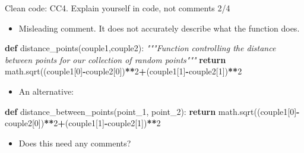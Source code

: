 \documentclass[
  8pt,
  ignorenonframetext,
]{beamer}
\newenvironment{Shaded}{\begin{snugshade}}{\end{snugshade}}
\newcommand{\CommentTok}[1]{\textcolor[rgb]{0.56,0.35,0.01}{\textit{#1}}}
\newcommand{\ControlFlowTok}[1]{\textcolor[rgb]{0.13,0.29,0.53}{\textbf{#1}}}
\newcommand{\DecValTok}[1]{\textcolor[rgb]{0.00,0.00,0.81}{#1}}
\newcommand{\KeywordTok}[1]{\textcolor[rgb]{0.13,0.29,0.53}{\textbf{#1}}}
\newcommand{\NormalTok}[1]{#1}
\newcommand{\OperatorTok}[1]{\textcolor[rgb]{0.81,0.36,0.00}{\textbf{#1}}}
\providecommand{\tightlist}{%
  \setlength{\itemsep}{0pt}\setlength{\parskip}{0pt}}
\begin{document}
\begin{frame}[fragile]{Clean code: CC4. Explain yourself in code, not
comments 2/4}
\protect\hypertarget{clean-code-cc4.-explain-yourself-in-code-not-comments-24}{}
\begin{itemize}
\tightlist
\item
  Misleading comment. It does not accurately describe what the function
  does.
\end{itemize}

\begin{Shaded}
\begin{Highlighting}[]
\KeywordTok{def}\NormalTok{ distance\_points(couple1,couple2):}
    \CommentTok{"""Function controlling the distance between points}
\CommentTok{    for our collection of random points"""}
    \ControlFlowTok{return}\NormalTok{ math.sqrt((couple1[}\DecValTok{0}\NormalTok{]}\OperatorTok{{-}}\NormalTok{couple2[}\DecValTok{0}\NormalTok{])}\OperatorTok{**}\DecValTok{2}\OperatorTok{+}\NormalTok{(couple1[}\DecValTok{1}\NormalTok{]}\OperatorTok{{-}}\NormalTok{couple2[}\DecValTok{1}\NormalTok{])}\OperatorTok{**}\DecValTok{2}
\end{Highlighting}
\end{Shaded}

\begin{itemize}
\tightlist
\item
  An alternative:
\end{itemize}

\begin{Shaded}
\begin{Highlighting}[]
\KeywordTok{def}\NormalTok{ distance\_between\_points(point\_1, point\_2):}
    \ControlFlowTok{return}\NormalTok{ math.sqrt((couple1[}\DecValTok{0}\NormalTok{]}\OperatorTok{{-}}\NormalTok{couple2[}\DecValTok{0}\NormalTok{])}\OperatorTok{**}\DecValTok{2}\OperatorTok{+}\NormalTok{(couple1[}\DecValTok{1}\NormalTok{]}\OperatorTok{{-}}\NormalTok{couple2[}\DecValTok{1}\NormalTok{])}\OperatorTok{**}\DecValTok{2}
\end{Highlighting}
\end{Shaded}

\begin{itemize}
\tightlist
\item
  Does this need any comments?
\end{itemize}
\end{frame}
\end{document}
